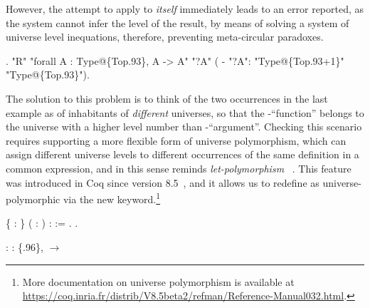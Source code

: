 However, the attempt to apply  to \textit{itself} immediately leads to an
error reported, as the system cannot infer the level of the result, by
means of solving a system of universe level inequations, therefore,
preventing meta-circular paradoxes.






\coqdoceol
\coqdocemptyline
\coqdocnoindent
{}  .\coqdoceol
\coqdocnoindent
\coqdoceol
\coqdocnoindent
{}  "R"   "forall A : Type@\{Top.93\}, A -> A"\coqdoceol
\coqdocnoindent
{}       "?A"\coqdoceol
\coqdocnoindent
(    -   "?A":   \coqdoceol
\coqdocnoindent
"Type@\{Top.93+1\}"     "Type@\{Top.93\}").

\coqdocemptyline


The solution to this problem is to think of the two occurrences  in
the last example as of inhabitants of \textit{different} universes, so that
the -``function'' belongs to the universe with a higher level number
than -``argument''. Checking this scenario requires supporting a more
flexible form of universe polymorphism, which can assign different
universe levels to different occurrences of the same definition in a
common expression, and in this sense reminds \textit{let-polymorphism}
~\cite[\S 22.7]{Pierce:BOOK02}.  This
feature was introduced in Coq since version
8.5~\cite{Sozeau-Tabareau:ITP14}, and it allows us to redefine 
as universe-polymorphic via the new  
keyword.\footnote{More documentation on universe polymorphism is
available
at \url{https://coq.inria.fr/distrib/V8.5beta2/refman/Reference-Manual032.html}.}


\begin{coqdoccode}
\coqdocemptyline
\coqdocnoindent
{}   \{ : \} ( : ) :  := .\coqdoceol
\coqdocemptyline
\coqdocnoindent
{} .\coqdoceol
\coqdocemptyline
\end{coqdoccode}
\coqdoceol
\coqdocemptyline
\coqdocnoindent
{} : \coqdockw{\ensuremath{\forall}}  : \{.96\},  \ensuremath{\rightarrow} 

